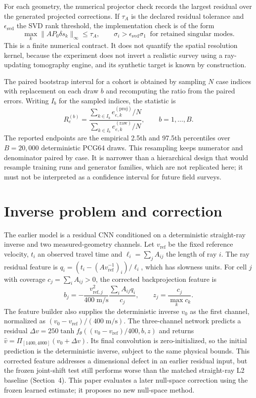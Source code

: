 \documentclass[11pt]{article}
\begin{document}
For each geometry, the numerical projector check records the largest residual over the generated projected corrections. If $\tau_A$ is the declared residual tolerance and $\epsilon_{\mathrm{svd}}$ the SVD rank threshold, the implementation check is of the form
\begin{equation}\label{eq:projection-check}
\max_k\|A P_0\delta s_k\|_{\infty}\leq\tau_A,
\qquad \sigma_i>\epsilon_{\mathrm{svd}}\sigma_1\;\;\text{for retained singular modes}.
\end{equation}
This is a finite numerical contract. It does not quantify the spatial resolution kernel, because the experiment does not invert a realistic survey using a ray-updating tomography engine, and its synthetic target is known by construction.

The paired bootstrap interval for a cohort is obtained by sampling $N$ case indices with replacement on each draw $b$ and recomputing the ratio from the paired errors. Writing $I_b$ for the sampled indices, the statistic is
\begin{equation}\label{eq:paired-bootstrap}
R_e^{(b)}=\frac{\sum_{k\in I_b} e_{e,k}^{(\mathrm{proj})}/N}{\sum_{k\in I_b}e_{e,k}^{(\mathrm{raw})}/N},\qquad b=1,\ldots,B.
\end{equation}
The reported endpoints are the empirical 2.5th and 97.5th percentiles over $B=20{,}000$ deterministic PCG64 draws. This resampling keeps numerator and denominator paired by case. It is narrower than a hierarchical design that would resample training runs and generator families, which are not replicated here; it must not be interpreted as a confidence interval for future field surveys.

\section{Inverse problem and correction}\label{sec:inverse-problem-and-correction}
The earlier model is a residual CNN conditioned on a deterministic straight-ray inverse and two measured-geometry channels. Let $v_{\mathrm{ref}}$ be the fixed reference velocity, $t_i$ an observed travel time and $\ell_i=\sum_j A_{ij}$ the length of ray $i$. The ray residual feature is $q_i=(t_i-(A v_{\mathrm{ref}}^{-1})_i)/\ell_i$, which has slowness units. For cell $j$ with coverage $c_j=\sum_i A_{ij}>0$, the corrected backprojection feature is
\[
  b_j=-\frac{v_{\mathrm{ref},j}^2}{400\;\mathrm{m/s}}\frac{\sum_i A_{ij}q_i}{c_j},
  \qquad z_j=\frac{c_j}{\max_k c_k}.
\]
The feature builder also supplies the deterministic inverse $v_0$ as the first channel, normalized as $(v_0-v_{\mathrm{ref}})/(400\;\mathrm{m/s})$. The three-channel network predicts a residual $\Delta v=250\tanh f_\theta((v_0-v_{\mathrm{ref}})/400,b,z)$ and returns $\hat v=\Pi_{[1400,4000]}(v_0+\Delta v)$. Its final convolution is zero-initialized, so the initial prediction is the deterministic inverse, subject to the same physical bounds. This corrected feature addresses a dimensional defect in an earlier residual input, but the frozen joint-shift test still performs worse than the matched straight-ray L2 baseline (Section~4). This paper evaluates a later null-space correction using the frozen learned estimate; it proposes no new null-space method.
\end{document}

